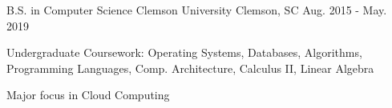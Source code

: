 

\begin{cventries}

  \cventry
    {B.S. in Computer Science} %
    {Clemson University} %
    {Clemson, SC} %
    {Aug. 2015 - May. 2019} %
    {
      \begin{cvitems} %
        \item {Undergraduate Coursework: Operating Systems, Databases, Algorithms, Programming Languages, Comp. Architecture, Calculus II, Linear Algebra}
        \item {Major focus in Cloud Computing }
      \end{cvitems}
    }

\end{cventries}

